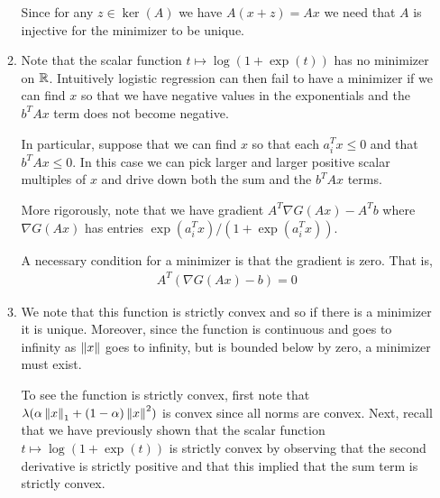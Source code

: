 \documentclass[10pt]{article}
\begin{document}
\begin{solution}[Solution]
\begin{enumerate}[label=(\alph*)]
\begin{enumerate}[label=(\roman*)]
                Since for any \( z \in \ker (A) \) we have \( A(x+z) = Ax \) we need that \( A \) is injective for the minimizer to be unique. 

            
            \item Note that the scalar function \( t\mapsto \log(1+\exp(t)) \) has no minimizer on \( \mathbb{R} \). Intuitively logistic regression can then fail to have a minimizer if we can find \( x \) so that we have negative values in the exponentials and the \( b^TAx \) term does not become negative.
                
                In particular, suppose that we can find \( x \) so that each \( a_i^Tx \leq 0 \) and that \( b^TAx \leq 0 \). In this case we can pick larger and larger positive scalar multiples of \( x \) and drive down both the sum and the \( b^TAx \) terms. 

                More rigorously, note that we have gradient \( A^T \nabla G(Ax) - A^Tb \) where \( \nabla G(Ax) \) has entries \( \exp(a_i^Tx)/(1+\exp(a_i^Tx)) \). 

                A necessary condition for a minimizer is that the gradient is zero. That is,
                \begin{align*}
                    A^T \left( \nabla G(Ax) - b \right) = 0
                \end{align*}
                

            \item 
                We note that this function is strictly convex and so if there is a minimizer it is unique. Moreover, since the function is continuous and goes to infinity as \( \left\lVert x\right\rVert \) goes to infinity, but is bounded below by zero, a minimizer must exist.
               
                To see the function is strictly convex, first note that \( \lambda (\alpha \left\lVert x\right\rVert_1 + (1-\alpha)\left\lVert x\right\rVert^2) \) is convex since all norms are convex. Next, recall that we have previously shown that the scalar function \( t\mapsto \log(1+\exp(t)) \) is strictly convex by observing that the second derivative is strictly positive and that this implied that the sum term is strictly convex. 


\end{enumerate}
\end{enumerate}
\end{solution}
\end{document}
